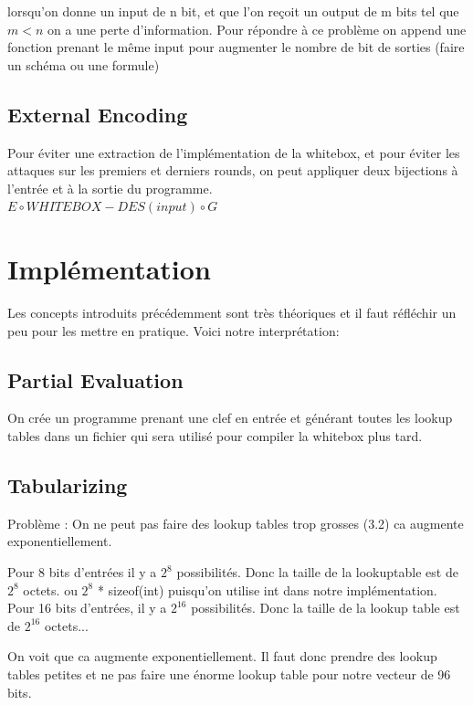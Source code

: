 \documentclass[a4paper,12pt]{article}
\begin{document}
lorsqu'on donne un input de n bit, et que l'on reçoit un output de m bits tel que $m < n$ on a une perte d'information. Pour répondre à ce problème on append une fonction prenant le même input pour augmenter le nombre de bit de sorties (faire un schéma ou une formule)

\subsection{External Encoding}

Pour éviter une extraction de l'implémentation de la whitebox, et pour éviter les attaques sur les premiers et derniers rounds, on peut appliquer deux bijections à l'entrée et à la sortie du programme.\\

$E \circ WHITEBOX-DES(input) \circ G$

\section{Implémentation}

Les concepts introduits précédemment sont très théoriques et il faut réfléchir un peu pour les mettre en pratique. Voici notre interprétation:

\subsection{Partial Evaluation}

On crée un programme prenant une clef en entrée et générant toutes les lookup tables dans un fichier qui sera utilisé pour compiler la whitebox plus tard.

\subsection{Tabularizing}

Problème :
On ne peut pas faire des lookup tables trop grosses (3.2) ca augmente exponentiellement.

Pour 8 bits d'entrées il y a $2^{8}$ possibilités. Donc la taille de la lookuptable est de $2^{8}$ octets. ou $2^{8}$ * sizeof(int) puisqu'on utilise int dans notre implémentation.
Pour 16 bits d'entrées, il y a $2^{16}$ possibilités. Donc la taille de la lookup table est de $2^{16}$ octets...

On voit que ca augmente exponentiellement. Il faut donc prendre des lookup tables petites et ne pas faire une énorme lookup table pour notre vecteur de 96 bits.
\end{document}
